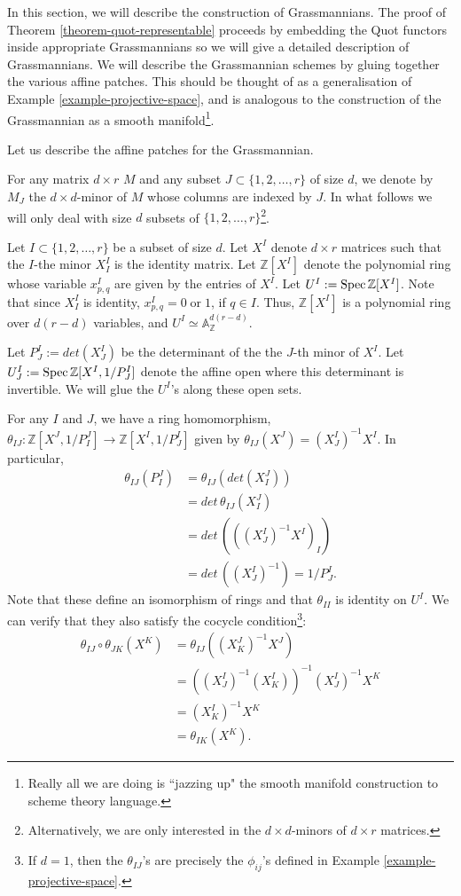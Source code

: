 \documentclass[ignorenonframetext,t]{beamer}
\newcommand{\Spec}{{\rm Spec \,}}
\newcommand{\A}{{\mathbb A}}
\newcommand{\Z}{{\mathbb Z}}
\theoremstyle{definition}
\begin{document}
In this section, we will describe the construction of Grassmannians. The proof of Theorem \ref{theorem-quot-representable} proceeds by embedding the Quot functors inside appropriate Grassmannians so we will give a detailed description of Grassmannians. We will describe the Grassmannian schemes by gluing together the various affine patches. This should be thought of as a generalisation of Example \ref{example-projective-space}, and is analogous to the construction of the Grassmannian as a smooth manifold\footnote{Really all we are doing is ``jazzing up" the smooth manifold construction to scheme theory language.}.

Let us describe the affine patches for the Grassmannian.

For any matrix $d\times r$ $M$ and any subset $J\subset \{1,2,\ldots,r\}$ of size $d$, we denote by $M_J$ the $d\times d$-minor of $M$ whose columns are indexed by $J$. In what follows we will only deal with size $d$ subsets of $\{1,2,\ldots,r\}$\footnote{Alternatively, we are only interested in the $d\times d$-minors of $d\times r$ matrices.}.

Let $I\subset \{1,2, \ldots,r\}$ be a subset of size $d$. Let $X^I$ denote $d\times r$ matrices such that the $I$-the minor $X^I_I$ is the identity matrix. Let $\Z[X^I]$ denote the polynomial ring whose variable $x^I_{p,q}$ are given by the entries of $X^I$. Let $U^I:=\Spec\Z[X^I]$. Note that since $X^I_I$ is identity, $x^I_{p,q}=0\; \text{or}\; 1$, if $q\in I$. Thus, $\Z[X^I]$ is a polynomial ring over  $d(r-d)$ variables, and $U^I\simeq \A^{d(r-d)}_\Z$.

Let $P^I_J:= det(X^I_J)$ be the determinant of the the $J$-th minor of $X^I$. Let $U^I_J:=\Spec\Z[X^I,1/P^I_J]$ denote the affine open where this determinant is invertible. We will glue the $U^I$'s along these open sets.

For any $I$ and $J$, we have a ring homomorphism, $\theta_{IJ}: \Z[X^J,1/P^J_I] \rightarrow \Z[X^I,1/P^I_J]$ given by $\theta_{IJ}(X^J)=(X^I_J)^{-1}X^I$. In particular, 
\begin{align*}
\theta_{IJ}(P^J_I) &= \theta_{IJ}(det(X^J_I))\\
&= det\, \theta_{IJ}(X^J_I)\\
&=det\, (((X^I_J)^{-1}X^I)_I)\\
&=det\, ((X^I_J)^{-1}) = 1/P^I_J.
\end{align*}
Note that these define an isomorphism of rings and that $\theta_{II}$ is identity on $U^I$. We can verify that they also satisfy the cocycle condition\footnote{If $d=1$, then the $\theta_{IJ}$'s are precisely the $\phi_{ij}$'s defined in Example \ref{example-projective-space}.}:
\begin{align*}
\theta_{IJ}\circ\theta_{JK}(X^K) &=\theta_{IJ}((X^J_K)^{-1}X^J)\\
&= \left((X^I_J)^{-1}(X^I_K)\right)^{-1} (X^I_J)^{-1}X^K\\
&= (X^I_K)^{-1}X^K \\
&= \theta_{IK}(X^K).
\end{align*}
\end{document}
